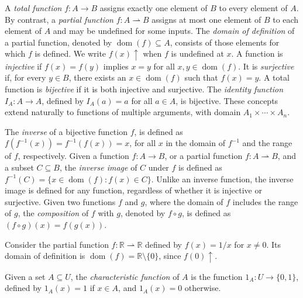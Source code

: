 A \emph{total function} $f: A \rightarrow B$ assigns exactly one element of $B$ to every element of $A$. By contrast, a \emph{partial function} $f: A \rightharpoonup B$ assigns at most one element of $B$ to each element of $A$ and may be undefined for some inputs. The \emph{domain of definition} of a partial function, denoted by $\operatorname{dom}(f) \subseteq A$, consists of those elements for which $f$ is defined. We write $f(x) \uparrow$ when $f$ is undefined at $x$. A function is \emph{injective} if $f(x) = f(y)$ implies $x = y$ for all $x,y \in \operatorname{dom}(f)$. It is \emph{surjective} if, for every $y \in B$, there exists an $x \in \operatorname{dom}(f)$ such that $f(x) = y$. A total function is \emph{bijective} if it is both injective and surjective. The \emph{identity function} $I_A: A \rightarrow A$, defined by $I_A(a) = a$ for all $a \in A$, is bijective. These concepts extend naturally to functions of multiple arguments, with domain $A_1 \times \cdots \times A_n$.

The \emph{inverse} of a bijective function $f$, is defined as $f(f^{-1}(x)) = f^{-1}(f(x)) = x$, for all $x$ in the domain of $f^{-1}$ and the range of $f$, respectively. Given a function $f: A \rightarrow B$, or a partial function $f: A \rightharpoonup B$, and a subset $C \subseteq B$, the \emph{inverse image}  of $C$ under $f$ is defined as $f^{-1}(C) = \{x \in \operatorname{dom}(f) : f(x) \in C\}$. Unlike an inverse function, the inverse image is defined for any function, regardless of whether it is injective or surjective. Given two functions $f$ and $g$, where the domain of $f$ includes the range of $g$, the \emph{composition} of $f$ with $g$, denoted by $f \circ g$, is defined as $(f \circ g)(x) = f(g(x))$.

\begin{example}
Consider the partial function $f: \mathbb{R} \rightharpoonup \mathbb{R}$ defined by $f(x) = 1/x$ for $x \neq 0$. Its domain of definition is $\operatorname{dom}(f) = \mathbb{R} \setminus \{0\}$, since $f(0) \uparrow$.
\end{example}

Given a set $A \subseteq U$, the \emph{characteristic function} of $A$ is the function $1_A : U \rightarrow \{0, 1\}$, defined by $1_A(x) = 1$ if $x \in A$, and $1_A(x) = 0$ otherwise.

